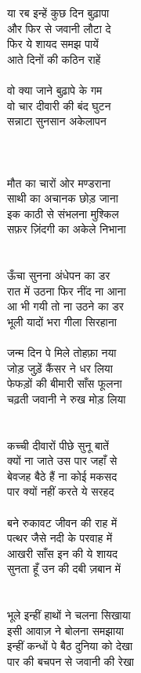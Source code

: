 {{{{{{{{{{{{{{{{{{{{{{{{{{{{{{{{{{{{{{{{{{{या रब इन्हें कुछ दिन बुढ़ापा\\
और फिर से जवानी लौटा दे\\
फिर ये शायद समझ पायें\\
आते दिनों की कठिन राहें\\
\\
वो क्या जाने बुढ़ापे के गम\\
वो चार दीवारी की बंद घुटन\\
सन्नाटा सुनसान अकेलापन\\
\\
\\
\\
मौत का चारों ओर मण्डराना\\
साथी का अचानक छोड़ जाना\\
इक काठी से संभलना मुश्किल\\
सफ़र ज़िंदगी का अकेले निभाना\\
\\
\\
ऊँचा सुनना अंधेपन का डर\\
रात में उठना फिर नींद ना आना\\
आ भी गयी तो ना उठने का डर\\
भूली यादों भरा गीला सिरहाना\\
\\
जन्म दिन पे मिले तोहफ़ा नया\\
जोड़ जुड़ें कैंसर ने धर लिया\\
फेफड़ों की बीमारी साँस फूलना\\
चढ़ती जवानी ने रुख मोड़ लिया\\
\\
\\
कच्ची दीवारों पीछे सुनू बातें\\
क्यों ना जाते उस पार जहाँ से\\
बेवजह बैठे हैं ना कोई मकसद\\
पार क्यों नहीं करते ये सरहद\\
\\
बने रुकावट जीवन की राह में\\
पत्थर जैसे नदी के परवाह में\\
आखरी साँस इन की ये शायद\\
सुनता हूँ उन की दबी ज़बान में\\
\\
\\
भूले इन्हीं हाथों ने चलना सिखाया\\
इसी आवाज़ ने बोलना समझाया\\
इन्हीं कन्धों पे बैठ दुनिया को देखा\\
पार की बचपन से जवानी की रेखा\\
}}}}}}}}}}}}}}}}}}}}}}}}}}}}}}}}}}}}}}}}}}}
